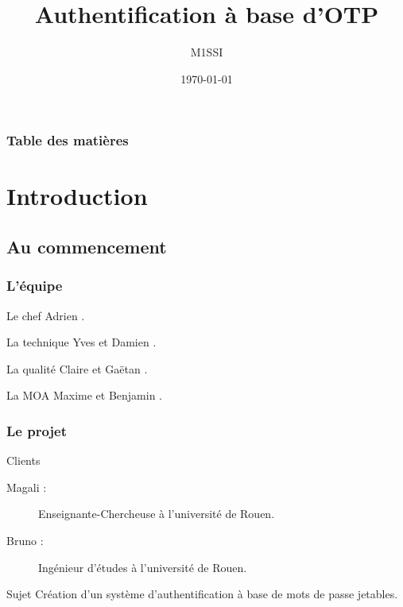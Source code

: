 \documentclass[xcolor=table]{beamer}
\title{Authentification \`{a} base d'OTP}
\author{M1SSI}
\institute[Université de Rouen] {
Université de Rouen \\
\medskip
}
\date{\today}
\begin{document}
\begin{frame}
\titlepage
\end{frame}

\begin{frame}
\frametitle{Table des matières}
\tableofcontents
\end{frame}

\section{Introduction}
\subsection{Au commencement}
\begin{frame}
\frametitle{L'équipe}
\begin{block}{Le chef}
Adrien .
\end{block}
\begin{block}{La technique}
Yves  et Damien .
\end{block}
\begin{block}{La qualité}
Claire  et Gaëtan .
\end{block}
\begin{block}{La MOA}
Maxime  et Benjamin .
\end{block}
\end{frame}


\begin{frame}
\frametitle{Le projet}

\begin{block}{Clients}
\begin{description}
\item[Magali :] Enseignante-Chercheuse à l'université de Rouen.\\
\item[Bruno :] Ingénieur d'études à l'université de Rouen.
\end{description}
\end{block}

\begin{block}{Sujet}
Création d'un système d'authentification à base de mots de passe jetables.
\end{block}
\end{frame}
\end{document}
